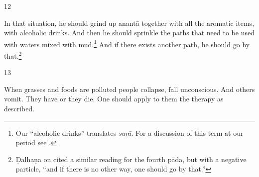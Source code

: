 \begin{translation}
\item [12]

In that situation, he should grind up \gls{anantā} together with all the aromatic
items, with alcoholic drinks.  And then  he should sprinkle the paths that need to
be used with waters mixed with mud.\footnote{Our “alcoholic drinks” translates
    \emph{surā}.  For a discussion of this term at our period see \cite[37--39
    \emph{et passim}]{mchu-2021a}.} And if there exists another path, he should go by
    that.\footnote{Ḍalhaṇa on  cited a similar reading for the fourth
        pāda, but with a negative particle,  “and if there is no other way, one should go
        by that.”}
    
    

\item [13]

When grasses and foods are polluted people collapse, fall unconscious. And 
others vomit. They have  or they die.
One should apply to them the therapy as described.



\end{translation}
